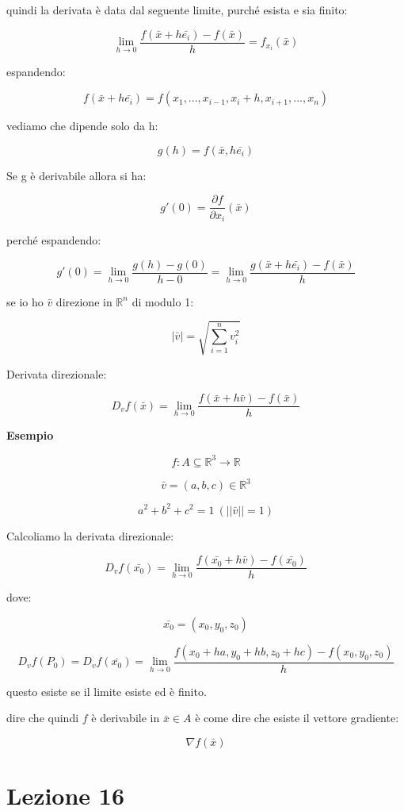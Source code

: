 \documentclass[11pt]{article}
\begin{document}
quindi la derivata è data dal seguente limite, purché esista e sia finito:

\[
\lim_{ h \to 0 } \frac{f(\bar{x} + h \bar{e_i}) - f(\bar{x} )}{h} = f_{x_i}(\bar{x} )
\]

espandendo:

\[
    f( \bar{x} +h \bar{e_i} ) = f( x_1,...,x_{i-1},x_i+h , x_{i+1},...,x_n)
\]

vediamo che dipende solo da h:

\[
    g(h) = f(\bar{x} ,h \bar{e_i} )
\]

Se g è derivabile allora si ha:

\[
    g'(0) = \frac{\partial f}{\partial x_i}(\bar{x} )
\]

perché espandendo:

\[
    g'(0) = \lim_{ h \to 0 } \frac{g(h) - g(0)}{h-0} = \lim_{ h \to 0 } \frac{g(\bar{x} +h \bar{e_i} ) - f(\bar{x} )}{h}
\]

se io ho $\bar{v} $ direzione in $\mathbb{R}^{n}$ di modulo 1:

\[
    |\bar{v} | = \sqrt{\sum^{n}_{i=1} v_i^{2}}
\]

Derivata direzionale:

\[
    D_v f(\bar{x} ) = \lim_{ h \to 0 } \frac{f(\bar{x} +h \bar{v} ) -f(\bar{x} )}{h}
\]


\textbf{Esempio} 

\[
    f: A \subseteq \mathbb{R}^{3} \rightarrow  \mathbb{R}
\]

\[
    \bar{v} = (a,b,c) \in \mathbb{R}^{3}
\]

\[
    a^{2}+b^{2}+c^{2}= 1\ (||\bar{v} || =1)
\]

Calcoliamo la derivata direzionale:

\[
    D_v f(\bar{x_0} ) = \lim_{ h \to 0 } \frac{f(\bar{x_0} + h \bar{v} ) -f(\bar{x_0} )}{h}
\]

dove:

\[
    \bar{x_0} = (x_0,y_0,z_0)
\]

\[
    D_v f(P_0) = D_v f(\bar{x_0} ) = \lim_{ h \to 0 } \frac{f(x_0+ha,y_0+hb,z_0+hc) - f(x_0,y_0,z_0)}{h}
\]

questo esiste se il limite esiste ed è finito.

dire che quindi $f$ è derivabile in $\bar{x} \in A$ è come dire che esiste il vettore gradiente:

\[
   \nabla f(\bar{x} ) 
\]

\section{Lezione 16}
\end{document}
